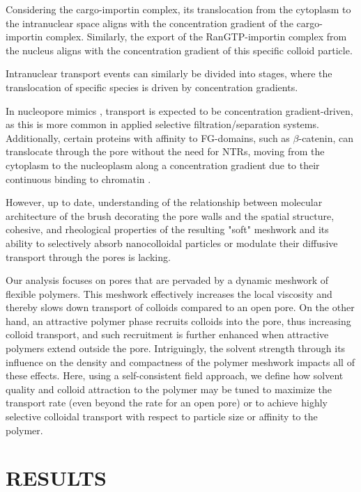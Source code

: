 \documentclass[12pt, a4paper]{article}
\begin{document}
Considering the cargo-importin complex, its translocation from the cytoplasm to the intranuclear space aligns with the concentration gradient of the cargo-importin complex. Similarly, the export of the RanGTP-importin complex from the nucleus aligns with the concentration gradient of this specific colloid particle.

Intranuclear transport events can similarly be divided into stages, where the translocation of specific species is driven by concentration gradients.

In nucleopore mimics \cite{Tijana2008, Yang2021}, transport is expected to be concentration gradient-driven, as this is more common in applied selective filtration/separation systems.
Additionally, certain proteins with affinity to FG-domains, such as $\beta$-catenin, can translocate through the pore without the need for NTRs, moving from the cytoplasm to the nucleoplasm along a concentration gradient due to their continuous binding to chromatin \cite{Rout2003}.


However, up to date, 
understanding of the relationship between molecular architecture of the brush decorating the pore walls and the spatial structure, cohesive, and rheological properties of the resulting "soft" meshwork and its ability to selectively absorb nanocolloidal particles
or modulate their diffusive transport through the pores is lacking.


Our analysis focuses on pores that are pervaded by a dynamic meshwork of flexible polymers. 
This meshwork effectively increases the local viscosity and thereby slows down transport of colloids compared to an open pore. 
On the other hand, an attractive polymer phase recruits colloids into the pore, thus increasing colloid transport, 
and such recruitment is further enhanced when attractive polymers extend outside the pore. 
Intriguingly, the solvent strength through its influence on the density and compactness of the polymer meshwork impacts all of these effects. 
Here, using a self-consistent field approach, we define how solvent quality and colloid attraction to the polymer may be tuned to maximize the transport rate (even beyond the rate for an open pore) or to achieve highly selective colloidal transport with respect to particle size or affinity to the polymer.


\section{RESULTS}
\end{document}
